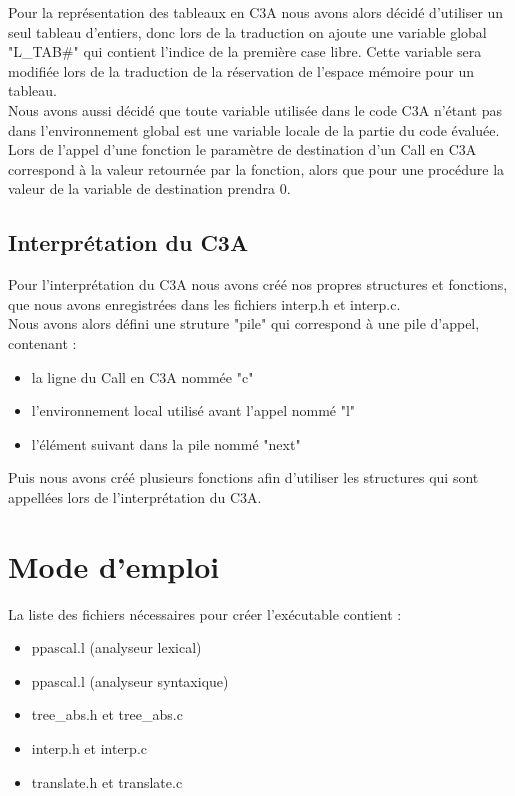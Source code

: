 \documentclass{report}
\begin{document}
Pour la représentation des tableaux en C3A nous avons alors décidé d'utiliser un seul tableau d'entiers, donc lors de la traduction on ajoute une variable global "L\_TAB\#" qui contient l'indice de la première case libre. Cette variable sera modifiée lors de la traduction de la réservation de l'espace mémoire pour un tableau.\\

Nous avons aussi décidé que toute variable utilisée dans le code C3A n'étant pas dans l'environnement global est une variable locale de la partie du code évaluée.\\

Lors de l'appel d'une fonction le paramètre de destination d'un Call en C3A correspond à la valeur retournée par la fonction, alors que pour une procédure la valeur de la variable de destination prendra 0.

\subsection{Interprétation du C3A}
Pour l'interprétation du C3A nous avons créé nos propres structures et fonctions, que nous avons enregistrées dans les fichiers interp.h et interp.c.\\

Nous avons alors défini une struture "pile" qui correspond à une pile d'appel, contenant :
\begin{itemize}
\item la ligne du Call en C3A nommée "c"
\item l'environnement local utilisé avant l'appel nommé "l"
\item l'élément suivant dans la pile nommé "next"
\end{itemize}
\bigskip

Puis nous avons créé plusieurs fonctions afin d'utiliser les structures qui sont appellées lors de l'interprétation du C3A.\\

\newpage
\section{Mode d'emploi}
La liste des fichiers nécessaires pour créer l'exécutable contient :
\begin{itemize}
\item ppascal.l (analyseur lexical)
\item ppascal.l (analyseur syntaxique)
\item tree\_abs.h et tree\_abs.c
\item interp.h et interp.c
\item translate.h et translate.c
\end{itemize}
\bigskip
\end{document}
